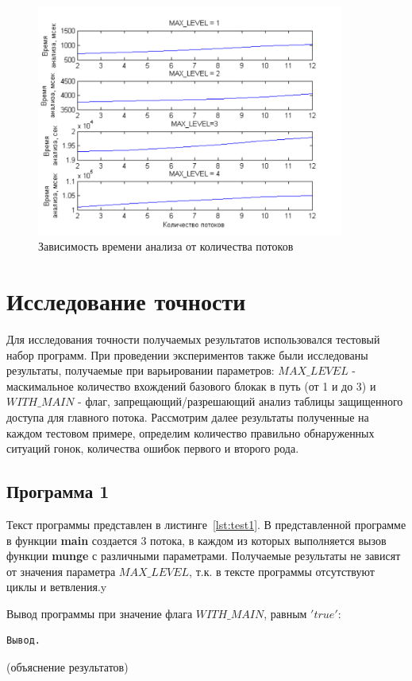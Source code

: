 \begin{figure}[ht]
  \centering
  \includegraphics[width=0.9\textwidth]{inc/png/graphic5}
  \caption{Зависимость времени анализа от количества потоков}
  \label{fig:graphic5}
\end{figure}


\section{Исследование точности}

Для исследования точности получаемых результатов использовался тестовый набор программ. При проведении экспериментов также были исследованы результаты, получаемые при варьировании параметров: $MAX\_LEVEL$ - маскимальное количество вхождений базового блокак в путь (от 1 и до 3)  и $WITH\_MAIN$ - флаг, запрещающий/разрешающий анализ таблицы защищенного доступа для главного потока. Рассмотрим далее результаты полученные на каждом тестовом примере, определим количество правильно обнаруженных ситуаций гонок, количества ошибок первого и второго рода.

\subsection{Программа 1}

Текст программы представлен в листинге~\ref{lst:test1}. В представленной программе в функции \textbf{main} создается 3 потока, в каждом из которых выполняется вызов функции \textbf{munge} с различными параметрами. Получаемые результаты не зависят от значения параметра $MAX\_LEVEL$, т.к. в тексте программы отсутствуют циклы и ветвления.y

Вывод программы при значение флага $WITH\_MAIN$, равным $'true'$:
\begin{verbatim}
Вывод.
\end{verbatim}
(объяснение результатов)


